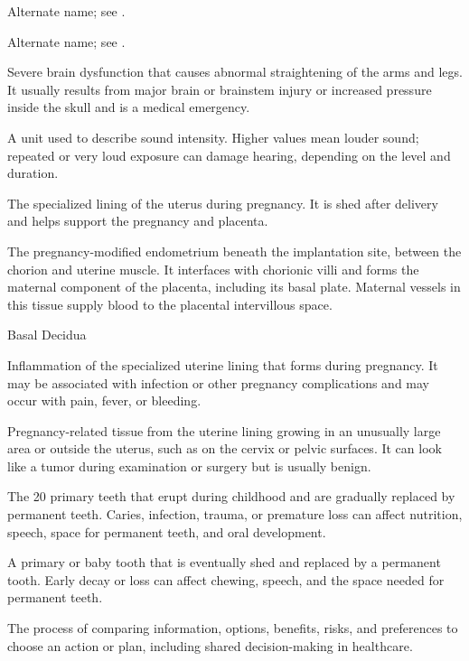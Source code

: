  Alternate name; see .

 Alternate name; see .

 Severe brain dysfunction that causes abnormal straightening of the arms and legs. It usually results from major brain or brainstem injury or increased pressure inside the skull and is a medical emergency.

 A unit used to describe sound intensity. Higher values mean louder sound; repeated or very loud exposure can damage hearing, depending on the level and duration.

 The specialized lining of the uterus during pregnancy. It is shed after delivery and helps support the pregnancy and placenta.

 The pregnancy-modified endometrium beneath the implantation
site, between the chorion and uterine muscle. It interfaces with chorionic villi and
forms the maternal component of the placenta, including its basal plate. Maternal
vessels in this tissue supply blood to the placental intervillous space.

\synonyms
Basal Decidua

 Inflammation of the specialized uterine lining that forms during pregnancy. It may be associated with infection or other pregnancy complications and may occur with pain, fever, or bleeding.

 Pregnancy-related tissue from the uterine lining growing in an unusually large area or outside the uterus, such as on the cervix or pelvic surfaces. It can look like a tumor during examination or surgery but is usually benign.

 The 20 primary teeth that erupt during childhood and are gradually replaced by permanent teeth. Caries, infection, trauma, or premature loss can affect nutrition, speech, space for permanent teeth, and oral development.

 A primary or baby tooth that is eventually shed and replaced by a permanent tooth. Early decay or loss can affect chewing, speech, and the space needed for permanent teeth.

 The process of comparing information, options, benefits, risks, and preferences to choose an action or plan, including shared decision-making in healthcare.

